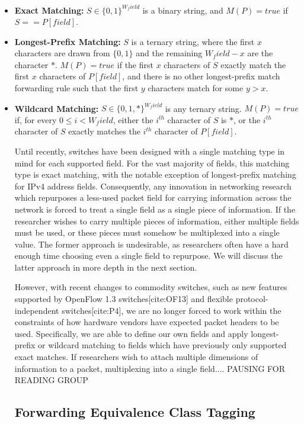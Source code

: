   \begin{itemize}
  \item{\textbf{Exact Matching:} $S \in \{0,1\}^{W_field}$ is a binary string, and $M(P) = true$ if $S == P[field]$.}\\
  \item{\textbf{Longest-Prefix Matching:} $S$ is a ternary string, where the first $x$ characters are drawn from $\{0,1\}$ and the remaining $W_field - x$ are the character $*$. $M(P) = true$ if the first $x$ characters of $S$ exactly match the first $x$ characters of $P[field]$, and there is no other longest-prefix match forwarding rule such that the first $y$ characters match for some $y > x$.}\\
  \item{\textbf{Wildcard Matching:} $S \in \{0,1,*\}^{W_field}$ is any ternary string. $M(P) = true$ if, for every $0 \le i < W_field$, either the $i^{th}$ character of $S$ is $*$, or the $i^{th}$ character of $S$ exactly matches the $i^{th}$ character of $P[field]$.
  
  Until recently, switches have been designed with a single matching type in mind for each supported field. For the vast majority of fields, this matching type is exact matching, with the notable exception of longest-prefix matching for IPv4 address fields. Consequently, any innovation in networking research which repurposes a less-used packet field for carrying information across the network is forced to treat a single field as a single piece of information. If the researcher wishes to carry multiple pieces of information, either multiple fields must be used, or these pieces must somehow be multiplexed into a single value. The former approach is undesirable, as researchers often have a hard enough time choosing even a single field to repurpose. We will discuss the latter approach in more depth in the next section. 
  
  However, with recent changes to commodity switches, such as new features supported by OpenFlow 1.3 switches[cite:OF13] and flexible protocol-independent switches[cite:P4], we are no longer forced to work within the constraints of how hardware vendors have expected packet headers to be used. Specifically, we are able to define our own fields and apply longest-prefix or wildcard matching to fields which have previously only supported exact matches. If researchers wish to attach multiple dimensions of information to a packet, multiplexing into a single field.... PAUSING FOR READING GROUP

\subsection{Forwarding Equivalence Class Tagging}
  
}
\end{itemize}
